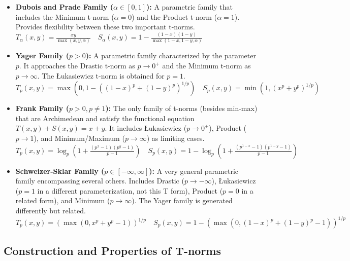 \begin{example}
\begin{itemize}
    \item \textbf{Dubois and Prade Family ($\alpha \in [0, 1]$):}
    A parametric family that includes the Minimum t-norm ($\alpha=0$) and the Product t-norm ($\alpha=1$). Provides flexibility between these two important t-norms. \\
    $T_\alpha(x, y) = \frac{xy}{\max(x, y, \alpha)} \quad S_\alpha(x, y) = 1 - \frac{(1-x)(1-y)}{\max(1-x, 1-y, \alpha)}$ 

    \item \textbf{Yager Family ($p > 0$):}
    A parametric family characterized by the parameter $p$. It approaches the Drastic t-norm as $p \to 0^+$ and the Minimum t-norm as $p \to \infty$. The Łukasiewicz t-norm is obtained for $p=1$. \\
    $T_p(x, y) = \max(0, 1 - ((1-x)^p + (1-y)^p)^{1/p}) \quad S_p(x, y) = \min(1, (x^p + y^p)^{1/p})$

    \item \textbf{Frank Family ($p > 0, p \neq 1$):}
    The only family of t-norms (besides min-max) that are Archimedean and satisfy the functional equation $T(x, y) + S(x, y) = x + y$. It includes Łukasiewicz ($p \to 0^+$), Product ($p \to 1$), and Minimum/Maximum ($p \to \infty$) as limiting cases. \\
    $T_p(x, y) = \log_p \left( 1 + \frac{(p^x - 1)(p^y - 1)}{p - 1} \right) \quad S_p(x, y) = 1 - \log_p \left( 1 + \frac{(p^{1-x} - 1)(p^{1-y} - 1)}{p - 1} \right)$

    \item \textbf{Schweizer-Sklar Family ($p \in [-\infty, \infty]$):}
    A very general parametric family encompassing several others. Includes Drastic ($p \to -\infty$), Łukasiewicz ($p=1$ in a different parameterization, not this T form), Product ($p=0$ in a related form), and Minimum ($p \to \infty$). The Yager family is generated differently but related. \\
    $T_p(x, y) = (\max(0, x^p + y^p - 1))^{1/p} \quad S_p(x, y) = 1 - (\max(0, (1-x)^p + (1-y)^p - 1))^{1/p}$ 
  \end{itemize}
\end{example}





\subsection{Construction and Properties of T-norms} %

